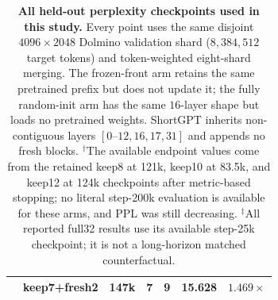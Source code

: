\begin{table}[t]
{\begin{tabular}{@{}llrrrrr@{}}
& keep7+fresh2 & 147k & 7 & 9 & 15.628 & $1.469\times$ \\
\bottomrule
\end{tabular}%
}
\caption{\textbf{All held-out perplexity checkpoints used in this study.}
Every point uses the same disjoint $4096\times2048$ Dolmino validation shard
($8{,}384{,}512$ target tokens) and token-weighted eight-shard merging. The
frozen-front arm retains the same pretrained prefix but does not update it; the
fully random-init arm has the same $16$-layer shape but loads no pretrained
weights. ShortGPT inherits non-contiguous layers $[0\text{--}12,16,17,31]$
and appends no fresh blocks. $^{\dagger}$The available endpoint values come
from the retained keep8 at 121k, keep10 at 83.5k, and keep12 at 124k checkpoints after
metric-based stopping; no literal step-200k evaluation is available for these
arms, and PPL was still decreasing. $^{\ddagger}$All reported full32 results
use its available step-25k checkpoint; it is not a long-horizon matched
counterfactual.}
\label{tab:app-ppl}
\end{table}
